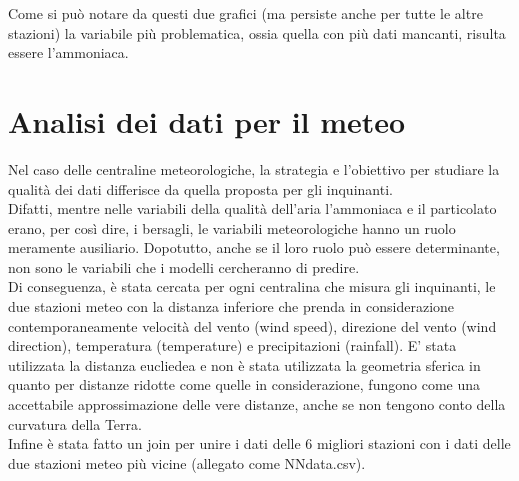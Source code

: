 \documentclass{article}
\begin{document}
Come si può notare da questi due grafici (ma persiste anche per tutte le altre stazioni) la variabile
più problematica, ossia quella con più dati mancanti, risulta essere l'ammoniaca.



\section{Analisi dei dati per il meteo}
Nel caso delle centraline meteorologiche, la strategia e l’obiettivo per studiare la qualità dei dati differisce da quella proposta 
per gli inquinanti. 
\\Difatti, mentre nelle variabili della qualità dell’aria l’ammoniaca e il particolato erano, 
per così dire, i bersagli, le variabili meteorologiche hanno un ruolo meramente ausiliario. 
Dopotutto, anche se il loro ruolo può essere determinante, non sono le variabili che i modelli cercheranno di predire. 
\\Di conseguenza, è stata cercata per ogni centralina che misura gli inquinanti, le due  
stazioni meteo con la distanza inferiore che prenda in considerazione contemporaneamente velocità del vento 
(wind speed), direzione del vento (wind direction), temperatura (temperature) e precipitazioni (rainfall).
E' stata utilizzata la distanza eucliedea e non è stata utilizzata la geometria sferica in quanto per distanze ridotte come quelle in considerazione, 
fungono come una accettabile approssimazione delle vere distanze, anche se non tengono conto della curvatura della Terra.
\\Infine è stata fatto un join per unire i dati delle 6 migliori stazioni con i dati delle due
stazioni meteo più vicine (allegato come NNdata.csv). 
\end{document}
